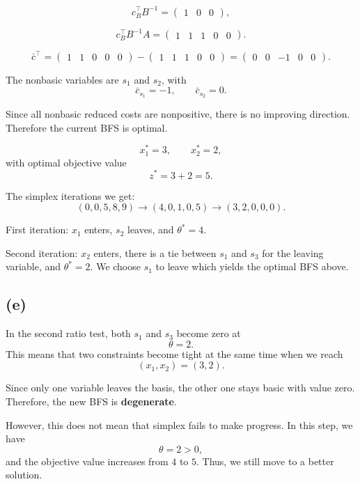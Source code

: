 \documentclass{article}
\begin{document}
\[
c_B^\top B^{-1}
=
\begin{pmatrix}
1&0&0
\end{pmatrix},
\]

\[
c_B^\top B^{-1}A
=
\begin{pmatrix}
1&1&1&0&0
\end{pmatrix}.
\]


\[
\bar c^\top
=
\begin{pmatrix}
1&1&0&0&0
\end{pmatrix}
-
\begin{pmatrix}
1&1&1&0&0
\end{pmatrix}
=
\begin{pmatrix}
0&0&-1&0&0
\end{pmatrix}.
\]

The nonbasic variables are $s_1$ and $s_2$, with
\[
\bar c_{s_1}=-1,
\qquad
\bar c_{s_2}=0.
\]

Since all nonbasic reduced costs are nonpositive, there is no
improving direction. Therefore the current BFS is optimal.


\[
\boxed{x_1^*=3,
\qquad
x_2^*=2,}
\]
with optimal objective value
\[
z^*=3+2=5.
\]

The simplex iterations we get: 
\[
\boxed{
(0,0,5,8,9)
\longrightarrow
(4,0,1,0,5)
\longrightarrow
(3,2,0,0,0).}
\]

First iteration: $x_1$ enters, $s_2$ leaves, and
$\theta^*=4$. 

Second iteration: $x_2$ enters, there is a tie
between $s_1$ and $s_3$ for the leaving variable, and
$\theta^*=2$. We choose $s_1$ to leave which yields the optimal BFS above.







\vspace{5mm}

\subsection*{(e)}


In the second ratio test, both $s_1$ and $s_3$ become zero at
\[
\theta=2.
\]
This means that two constraints become tight at the same time when we reach
\[
(x_1,x_2)=(3,2).
\]

Since only one variable leaves the basis, the other one stays basic with value zero. Therefore, the new BFS is \textbf{degenerate}.

However, this does not mean that simplex fails to make progress. In this step, we have
\[
\theta=2>0,
\]
and the objective value increases from $4$ to $5$. Thus, we still move to a better solution.
\end{document}
